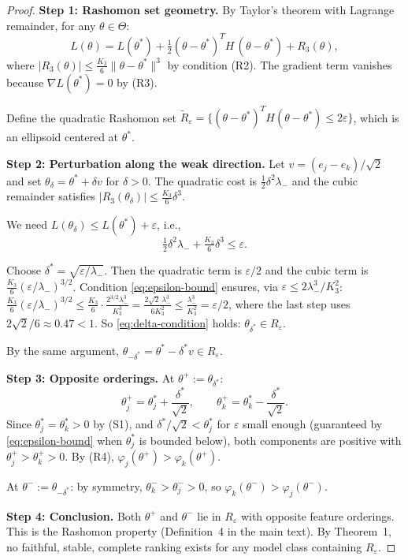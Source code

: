 \documentclass{article}
\begin{document}
\begin{proof}
\textbf{Step 1: Rashomon set geometry.}
By Taylor's theorem with Lagrange remainder, for any
$\theta \in \Theta$:
\begin{equation}
\label{eq:taylor}
    L(\theta) = L(\theta^*) + \tfrac{1}{2}(\theta - \theta^*)^T
    H\, (\theta - \theta^*) + R_3(\theta),
\end{equation}
where $|R_3(\theta)| \leq \frac{K_3}{6}\|\theta - \theta^*\|^3$
by condition (R2). The gradient term vanishes because
$\nabla L(\theta^*) = 0$ by (R3).

Define the quadratic Rashomon set
$\tilde{R}_\varepsilon = \{(\theta-\theta^*)^T H (\theta-\theta^*) \leq 2\varepsilon\}$, which is an ellipsoid centered at $\theta^*$.

\textbf{Step 2: Perturbation along the weak direction.}
Let $v = (e_j - e_k)/\sqrt{2}$ and set
$\theta_\delta = \theta^* + \delta v$ for $\delta > 0$.
The quadratic cost is $\tfrac{1}{2}\delta^2 \lambda_-$ and the
cubic remainder satisfies $|R_3(\theta_\delta)| \leq
\frac{K_3}{6}\delta^3$.

We need $L(\theta_\delta) \leq L(\theta^*) + \varepsilon$, i.e.,
\begin{equation}
\label{eq:delta-condition}
    \tfrac{1}{2}\delta^2 \lambda_- + \tfrac{K_3}{6}\delta^3
    \leq \varepsilon.
\end{equation}

Choose $\delta^* = \sqrt{\varepsilon / \lambda_-}$.
Then the quadratic term is $\varepsilon/2$ and the cubic term is
$\frac{K_3}{6}(\varepsilon/\lambda_-)^{3/2}$.
Condition \eqref{eq:epsilon-bound} ensures, via $\varepsilon \leq 2\lambda_-^3/K_3^2$:
$\frac{K_3}{6}(\varepsilon/\lambda_-)^{3/2}
\leq \frac{K_3}{6} \cdot \frac{2^{3/2}\lambda_-^3}{K_3^3}
= \frac{2\sqrt{2}\,\lambda_-^3}{6K_3^2}
\leq \frac{\lambda_-^3}{K_3^2} = \varepsilon/2$,
where the last step uses $2\sqrt{2}/6 \approx 0.47 < 1$.
So \eqref{eq:delta-condition} holds:
$\theta_{\delta^*} \in R_\varepsilon$.

By the same argument, $\theta_{-\delta^*} = \theta^* - \delta^* v
\in R_\varepsilon$.

\textbf{Step 3: Opposite orderings.}
At $\theta^+ := \theta_{\delta^*}$:
\[
    \theta^+_j = \theta^*_j + \frac{\delta^*}{\sqrt{2}},
    \qquad
    \theta^+_k = \theta^*_k - \frac{\delta^*}{\sqrt{2}}.
\]
Since $\theta^*_j = \theta^*_k > 0$ by (S1), and
$\delta^*/\sqrt{2} < \theta^*_j$ for $\varepsilon$ small enough
(guaranteed by \eqref{eq:epsilon-bound} when $\theta^*_j$ is
bounded below), both components are positive with
$\theta^+_j > \theta^+_k > 0$.
By (R4), $\varphi_j(\theta^+) > \varphi_k(\theta^+)$.

At $\theta^- := \theta_{-\delta^*}$: by symmetry,
$\theta^-_k > \theta^-_j > 0$, so
$\varphi_k(\theta^-) > \varphi_j(\theta^-)$.

\textbf{Step 4: Conclusion.}
Both $\theta^+$ and $\theta^-$ lie in $R_\varepsilon$ with
opposite feature orderings. This is the Rashomon property
(Definition~4 in the main text). By Theorem~1,
no faithful, stable, complete ranking exists for any model
class containing $R_\varepsilon$.
\end{proof}
\end{document}
